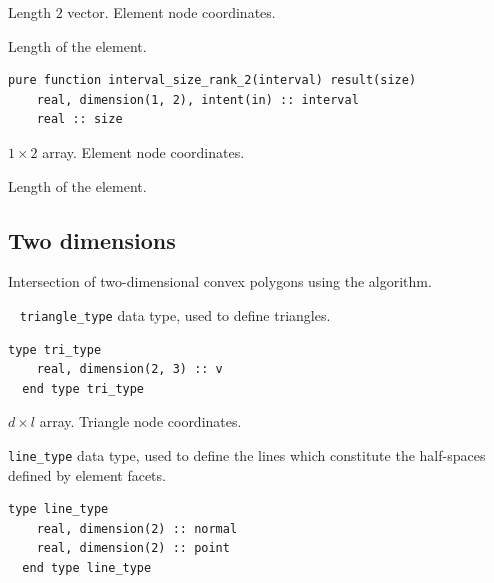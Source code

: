 \documentclass{article}
\begin{document}
\begin{description}[font=\ttfamily\bfseries,leftmargin=2.2\parindent,labelindent=1.7\parindent,noitemsep]
  \item[interval] Length $2$ vector. Element node coordinates.
  \item[size] Length of the element.
\end{description}
  
\begin{lstlisting}[language=FORTRAN]    
  pure function interval_size_rank_2(interval) result(size)
    real, dimension(1, 2), intent(in) :: interval
    real :: size
\end{lstlisting} 

\begin{description}[font=\ttfamily\bfseries,leftmargin=2.2\parindent,labelindent=1.7\parindent,noitemsep]
  \item[interval] $1 \times 2$ array. Element node coordinates.
  \item[size] Length of the element.
\end{description}

\subsection{Two dimensions}\label{sect:2D_intersection}

Intersection of two-dimensional convex polygons using the \citet{sutherland1974}
algorithm.

~\newline
\verb+triangle_type+ data type, used to define triangles.

\begin{lstlisting}[language=FORTRAN]    
  type tri_type
    real, dimension(2, 3) :: v
  end type tri_type
\end{lstlisting} 

\begin{description}[font=\ttfamily\bfseries,leftmargin=2.2\parindent,labelindent=1.7\parindent,noitemsep]
  \item[v] $d \times l$ array. Triangle node coordinates.
\end{description}

\noindent \verb+line_type+ data type, used to define the lines which constitute
the half-spaces defined by element facets.

\begin{lstlisting}[language=FORTRAN]   
  type line_type
    real, dimension(2) :: normal
    real, dimension(2) :: point
  end type line_type
\end{lstlisting} 
\end{document}
